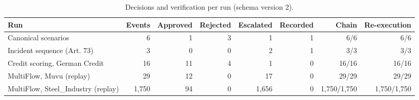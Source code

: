 \begin{table}[t]
\caption{Decisions and verification per run (schema version 2).}
\label{tab:runs}
\footnotesize
\begin{tabularx}{\textwidth}{@{}Lrrrrrrr@{}}
\toprule
Run & Events & Approved & Rejected & Escalated & Recorded & Chain & Re-execution \\
\midrule
Canonical scenarios & 6 & 1 & 3 & 1 & 1 & 6/6 & 6/6 \\
Incident sequence (Art. 73) & 3 & 0 & 0 & 2 & 1 & 3/3 & 3/3 \\
Credit scoring, German Credit & 16 & 11 & 4 & 1 & 0 & 16/16 & 16/16 \\
MultiFlow, Muvu (replay) & 29 & 12 & 0 & 17 & 0 & 29/29 & 29/29 \\
MultiFlow, Steel\_Industry (replay) & 1,750 & 94 & 0 & 1,656 & 0 & 1,750/1,750 & 1,750/1,750 \\
\bottomrule
\end{tabularx}
\end{table}
